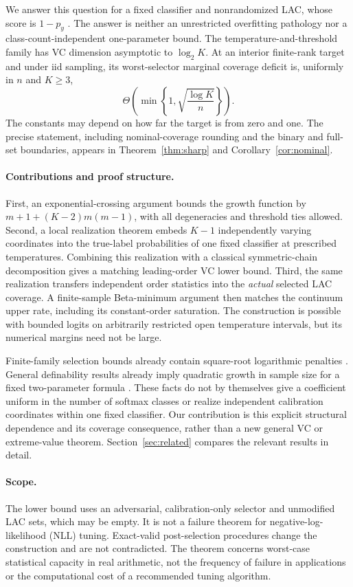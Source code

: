 \documentclass[10pt]{article}
\theoremstyle{definition}\newtheorem{definition}[theorem]{Definition}
\theoremstyle{remark}\newtheorem{remark}[theorem]{Remark}
\newcommand{\1}{\mathbf 1}
\begin{document}
We answer this question for a fixed classifier and nonrandomized LAC, whose score is $1-p_y$ \citep{sadinle2018}. The answer is neither an unrestricted overfitting pathology nor a class-count-independent one-parameter bound. The temperature-and-threshold family has VC dimension asymptotic to $\log_2 K$. At an interior finite-rank target and under iid sampling, its worst-selector marginal coverage deficit is, uniformly in $n$ and $K\ge3$,
\[
 \Theta\!\left(\min\left\{1,\sqrt{\frac{\log K}{n}}\right\}\right).
\]
The constants may depend on how far the target is from zero and one. The precise statement, including nominal-coverage rounding and the binary and full-set boundaries, appears in Theorem~\ref{thm:sharp} and Corollary~\ref{cor:nominal}.

\paragraph{Contributions and proof structure.}
First, an exponential-crossing argument bounds the growth function by $m+1+(K-2)m(m-1)$, with all degeneracies and threshold ties allowed. Second, a local realization theorem embeds $K-1$ independently varying coordinates into the true-label probabilities of one fixed classifier at prescribed temperatures. Combining this realization with a classical symmetric-chain decomposition gives a matching leading-order VC lower bound. Third, the same realization transfers independent order statistics into the \emph{actual} selected LAC coverage. A finite-sample Beta-minimum argument then matches the continuum upper rate, including its constant-order saturation. The construction is possible with bounded logits on arbitrarily restricted open temperature intervals, but its numerical margins need not be large.

Finite-family selection bounds already contain square-root logarithmic penalties \citep{yang2024}. General definability results already imply quadratic growth in sample size for a fixed two-parameter formula \citep{aschenbrenner2011}. These facts do not by themselves give a coefficient uniform in the number of softmax classes or realize independent calibration coordinates within one fixed classifier. Our contribution is this explicit structural dependence and its coverage consequence, rather than a new general VC or extreme-value theorem. Section~\ref{sec:related} compares the relevant results in detail.

\paragraph{Scope.}
The lower bound uses an adversarial, calibration-only selector and unmodified LAC sets, which may be empty. It is not a failure theorem for negative-log-likelihood (NLL) tuning. Exact-valid post-selection procedures change the construction and are not contradicted. The theorem concerns worst-case statistical capacity in real arithmetic, not the frequency of failure in applications or the computational cost of a recommended tuning algorithm.
\end{document}
